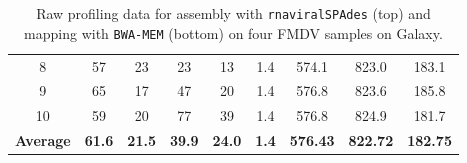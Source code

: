 \begin{table}[ht!]
\begin{tabular}{ccccccccc}
		\multicolumn{1}{c|}{8}               & 57                                                           & 23                                                                & 23                                                               & \multicolumn{1}{c|}{13}                                                               & 1.4                                                           & 574.1                                                              & 823.0                                                             & 183.1                                                             \\
		\multicolumn{1}{c|}{9}               & 65                                                           & 17                                                                & 47                                                               & \multicolumn{1}{c|}{20}                                                               & 1.4                                                           & 576.8                                                              & 823.6                                                             & 185.8                                                             \\
		\multicolumn{1}{c|}{10}              & 59                                                           & 20                                                                & 77                                                               & \multicolumn{1}{c|}{39}                                                               & 1.4                                                           & 576.8                                                              & 824.9                                                             & 181.7                                                             \\ \hline
		\textbf{Average}                     & \textbf{61.6}                                                & \textbf{21.5}                                                     & \textbf{39.9}                                                    & \textbf{24.0}                                                                         & \textbf{1.4}                                                  & \textbf{576.43}                                                    & \textbf{822.72}                                                   & \textbf{182.75}                                                   \\ \hline
	\end{tabular}
	\caption[Raw profiling data to compare assembly and reference-based mapping with FMDV samples.]{Raw profiling data for assembly with \texttt{rnaviralSPAdes} (top) and mapping with \texttt{BWA-MEM} (bottom) on four FMDV samples on Galaxy.}
\label{tab:fmdv-profiling}
\end{table}
